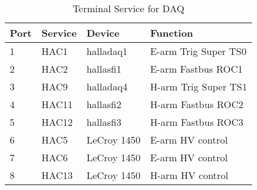 \begin{table}\centering
\caption[Data Acquisition: Terminal Service for DAQ]{Terminal Service for DAQ}
\begin{tabular}{|l|l|l|l|}  \hline
Port  &   Service & Device & Function\\ \hline
 1    &   HAC1    & halladaq1  & E-arm Trig Super TS0\\
 2    &   HAC2    & hallasfi1  & E-arm Fastbus ROC1\\
 3    &   HAC9    & halladaq4 & H-arm Trig Super TS1 \\
 4    &   HAC11   & hallasfi2  & H-arm Fastbus ROC2\\
 5    &   HAC12   & hallasfi3  & H-arm Fastbus ROC3\\
 6    &   HAC5    & LeCroy 1450 & E-arm HV control\\
 7    &   HAC6    & LeCroy 1450 & E-arm HV control\\
 8    &   HAC13   & LeCroy 1450  & H-arm HV control\\
\hline
\end{tabular}
\end{table}




 
%
%
%
